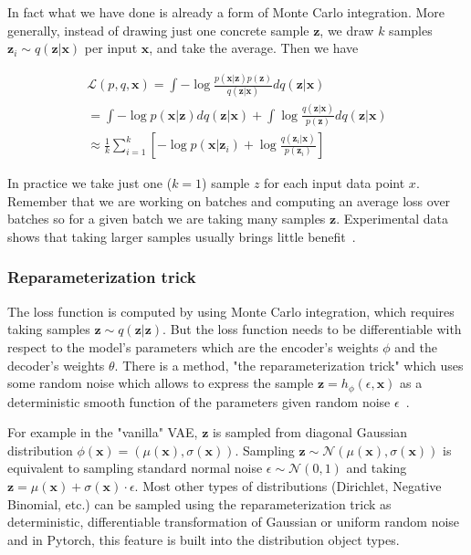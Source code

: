 \documentclass[11pt, a4paper]{report}
\theoremstyle{plain}
\theoremstyle{definition}
\theoremstyle{remark}
\newcommand{\x}{\mathbf{x}}
\newcommand{\z}{\mathbf{z}}
\newcommand{\LL}{\mathcal{L}}
\newcommand{\NN}{\mathcal{N}}
\begin{document}
In fact what we have done is already a form of Monte Carlo integration.
More generally, instead of drawing just one concrete sample $\z$, we draw $k$ samples
$\z_i \sim q(\z | \x)$ per input $\x$, and take the average. Then we have

\begin{equation}
\begin{aligned}
\LL(p,q,\x) = 
\int - \log \frac{p(\x|\z)p(\z)}{q(\z|\x)}dq(\z|\x) \\
= \int -\log p(\x|\z)dq(\z|\x) + 
\int \log \frac{q(\z|\x)}{p(\z)}dq(\z|\x) \\
\approx \frac{1}{k} \sum_{i=1}^k [-\log p(\x|\z_i)
+ \log \frac{q(\z_i|\x)}{p(\z_i)} ]
\label{eq:elbomc}
\end{aligned}
\end{equation}

In practice we take just one ($k=1$) sample $z$ for each input data point $x$.
Remember that we are working on batches and computing an average loss over
batches so for a given batch we are taking many samples $\z$.
Experimental data shows that taking larger samples usually brings little
benefit~\cite{kingma2019introduction}.

\subsubsection{Reparameterization trick}

The loss function is computed by using Monte Carlo integration, which requires
taking samples $\z \sim q(\z | \z)$. But the loss function needs to be 
differentiable with respect to the model's parameters which are 
the encoder's weights $\phi$ and the
decoder's weights $\theta$. There is a method, "the reparameterization
trick" which uses
some random noise  which allows to express the
sample $\z = h_{\phi}(\epsilon, \x)$ as a deterministic smooth function of 
the parameters 
given random noise $\epsilon$~\cite{kingma2013auto}.

For example in the "vanilla" VAE, $\z$ is sampled from
diagonal Gaussian distribution $\phi(\x) = (\mu(\x), \sigma(\x))$. Sampling
$\z \sim \NN(\mu(\x), \sigma(\x))$ is equivalent to sampling standard
normal noise
$\epsilon \sim \NN(0,1)$ and taking $\z = \mu(\x) + \sigma(\x) \cdot \epsilon$.
Most other types of distributions (Dirichlet, Negative Binomial, etc.) can be
sampled using the reparameterization trick as deterministic, differentiable
transformation of Gaussian or uniform random noise and in Pytorch, this feature
is built into the distribution object types.
\end{document}
